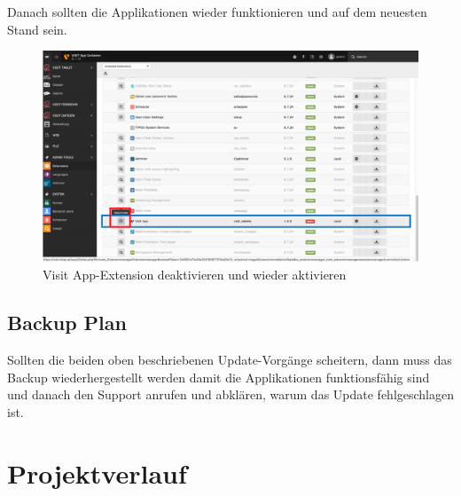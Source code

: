 Danach sollten die Applikationen wieder funktionieren und auf dem neuesten Stand sein.

\begin{figure}[ht!]
\centering
\includegraphics[width=12cm]{Figures/paula/update_prozess/update_extension.png}
\caption{Visit App-Extension deaktivieren und wieder aktivieren}
\label{img:extension}
\end{figure}

\subsection{Backup Plan}

Sollten die beiden oben beschriebenen Update-Vorgänge scheitern, dann muss das Backup wiederhergestellt werden damit die Applikationen funktionsfähig sind und danach den Support anrufen und abklären, warum das Update fehlgeschlagen ist.



\section{Projektverlauf}

